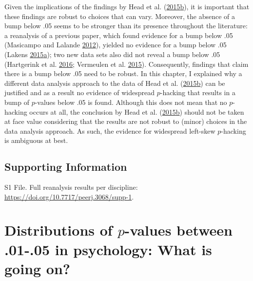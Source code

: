 \documentclass[a5paper]{book}
\begin{document}
Given the implications of the findings by Head et al.
(\protect\hyperlink{ref-doi:10.1371ux2fjournal.pbio.1002106}{2015}\protect\hyperlink{ref-doi:10.1371ux2fjournal.pbio.1002106}{b}),
it is important that these findings are robust to choices that can vary.
Moreover, the absence of a bump below .05 seems to be stronger than its
presence throughout the literature: a reanalysis of a previous paper,
which found evidence for a bump below .05 (Masicampo and Lalande
\protect\hyperlink{ref-doi:10.1080ux2f17470218.2012.711335}{2012}),
yielded no evidence for a bump below .05 (Lakens
\protect\hyperlink{ref-doi:10.1080ux2f17470218.2014.982664}{2015}\protect\hyperlink{ref-doi:10.1080ux2f17470218.2014.982664}{a});
two new data sets also did not reveal a bump below .05 (Hartgerink et
al. \protect\hyperlink{ref-doi:10.7717ux2fpeerj.1935}{2016}; Vermeulen
et al.
\protect\hyperlink{ref-doi:10.1080ux2f19312458.2015.1096333}{2015}).
Consequently, findings that claim there is a bump below .05 need to be
robust. In this chapter, I explained why a different data analysis
approach to the data of Head et al.
(\protect\hyperlink{ref-doi:10.1371ux2fjournal.pbio.1002106}{2015}\protect\hyperlink{ref-doi:10.1371ux2fjournal.pbio.1002106}{b})
can be justified and as a result no evidence of widespread \(p\)-hacking
that results in a bump of \(p\)-values below .05 is found. Although this
does not mean that no \(p\)-hacking occurs at all, the conclusion by
Head et al.
(\protect\hyperlink{ref-doi:10.1371ux2fjournal.pbio.1002106}{2015}\protect\hyperlink{ref-doi:10.1371ux2fjournal.pbio.1002106}{b})
should not be taken at face value considering that the results are not
robust to (minor) choices in the data analysis approach. As such, the
evidence for widespread left-skew \(p\)-hacking is ambiguous at best.

\section{Supporting Information}\label{supporting-information}

S1 File. Full reanalysis results per discipline:
\url{https://doi.org/10.7717/peerj.3068/supp-1}.

\chapter{\texorpdfstring{Distributions of \(p\)-values between .01-.05
in psychology: What is going
on?}{Distributions of p-values between .01-.05 in psychology: What is going on?}}\label{distributions-of-p-values-between-.01-.05-in-psychology-what-is-going-on}
\end{document}
